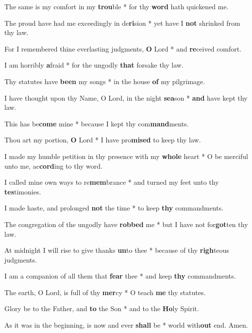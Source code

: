 \begin{multicols}{2}
		The same is my comfort in my \textbf{trou}ble * for thy \textbf{word} hath quickened me.
		
		The proud have had me exceedingly in de\textbf{ri}sion * yet have I \textbf{not} shrinked from thy law.
		
		For I remembered thine everlasting judgments, \textbf{O} Lord * and \textbf{re}ceived comfort.
		
		I am horribly \textbf{a}fraid * for the ungodly \textbf{that} forsake thy law.
		
		Thy statutes have \textbf{been} my songs * in the house \textbf{of} my pilgrimage.
		
		I have thought upon thy Name, O Lord, in the night \textbf{sea}son * \textbf{and} have kept thy law.
		
		This has be\textbf{come} mine * because I kept thy com\textbf{mand}ments.
		
		Thou art my portion, \textbf{O} Lord * I have pro\textbf{mised} to keep thy law.
		
		I made my humble petition in thy presence with my \textbf{whole} heart * O be merciful unto me, ac\textbf{cord}ing to thy word.
		
		I called mine own ways to re\textbf{mem}brance * and turned my feet unto thy \textbf{tes}timonies.
		
		I made haste, and prolonged \textbf{not} the time * to keep \textbf{thy} commandments.
		
		The congregation of the ungodly have \textbf{robbed} me * but I have not for\textbf{got}ten thy law.
		
		At midnight I will rise to give thanks \textbf{un}to thee * because of thy \textbf{righ}teous judgments.
		
		I am a companion of all them that \textbf{fear} thee * and keep \textbf{thy} commandments.
		
		The earth, O Lord, is full of thy \textbf{mer}cy * O teach \textbf{me} thy statutes.
		
		Glory be to the Father, and \textbf{to} the Son * and to the \textbf{Ho}ly Spirit.
		
		As it was in the beginning, is now and ever \textbf{shall} be * world with\textbf{out} end. Amen.
\end{multicols}